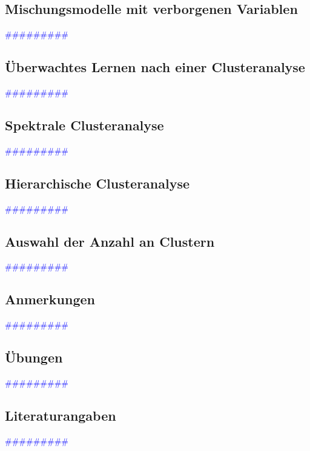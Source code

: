 \documentclass{article}
\begin{document}
  \subsection{Mischungsmodelle mit verborgenen Variablen} %
      \textcolor{blue}{\#\#\#\#\#\#\#\#\#}
  \subsection{Überwachtes Lernen nach einer Clusteranalyse} %
      \textcolor{blue}{\#\#\#\#\#\#\#\#\#}
  \subsection{Spektrale Clusteranalyse} %
      \textcolor{blue}{\#\#\#\#\#\#\#\#\#}
  \subsection{Hierarchische Clusteranalyse} %
      \textcolor{blue}{\#\#\#\#\#\#\#\#\#}
  \subsection{Auswahl der Anzahl an Clustern} %
      \textcolor{blue}{\#\#\#\#\#\#\#\#\#}
  \subsection{Anmerkungen} %
      \textcolor{blue}{\#\#\#\#\#\#\#\#\#}
  \subsection{Übungen} %
      \textcolor{blue}{\#\#\#\#\#\#\#\#\#}
  \subsection{Literaturangaben} %
      \textcolor{blue}{\#\#\#\#\#\#\#\#\#}
\end{document}
